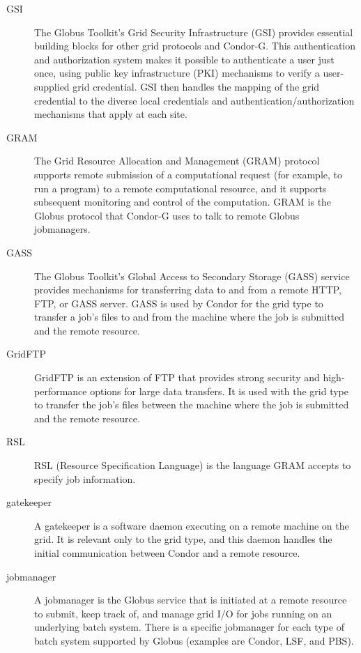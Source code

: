 \begin{description}
\item[GSI]
The Globus Toolkit's Grid Security Infrastructure (GSI) provides essential
building blocks for other grid protocols and Condor-G.
This authentication and authorization system
makes it possible to authenticate a user just once,
using public key infrastructure (PKI) mechanisms to verify
a user-supplied grid credential.
GSI then handles the mapping of the grid credential to the
diverse local credentials and authentication/authorization mechanisms that
apply at each site. 
\item[GRAM]
The Grid Resource Allocation and Management (GRAM) protocol supports remote
submission of a computational request (for example, to run a program)
to a remote computational resource,
and it supports subsequent monitoring and control of the computation. 
GRAM is the Globus protocol that Condor-G uses to talk to remote Globus
  jobmanagers.
\item[GASS]
The Globus Toolkit's Global Access to Secondary Storage (GASS) service provides
mechanisms for transferring data to and from a remote HTTP, FTP, or GASS server. 
GASS is used by Condor for the 
 grid type
to transfer a job's files
to and from the machine where the job is submitted and the remote resource.
\item[GridFTP]
GridFTP is an extension of FTP that provides strong security and 
high-performance options for large data transfers.
It is used with the  grid type
to transfer the job's files between the machine where the job
is submitted and the remote resource.
\item[RSL]
RSL (Resource Specification Language)  is the language GRAM 
accepts to specify job information.
\item[gatekeeper]
A gatekeeper is a software daemon executing on a remote machine on
the grid.
It is relevant only to the  grid type,
and this daemon handles the initial communication between
Condor and a remote resource.
\item[jobmanager]
A jobmanager is
the Globus service that is initiated at a remote resource to submit,
keep track of, and manage grid I/O for jobs running on 
an underlying batch system.
There is a specific jobmanager for each type of
batch system supported by Globus (examples are Condor, LSF, and PBS).

\end{description}


